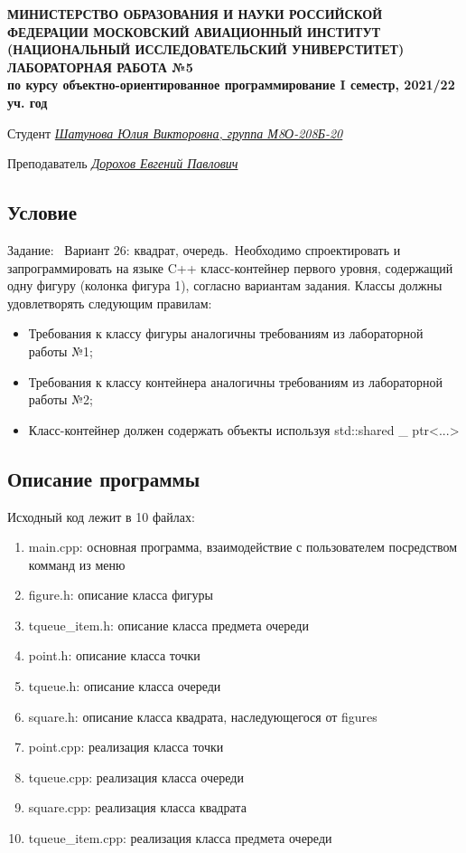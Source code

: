 \documentclass[12pt]{article}
\begin{document}
\begin{titlepage}
\begin{center}
\textbf{МИНИСТЕРСТВО ОБРАЗОВАНИЯ И НАУКИ РОССИЙСКОЙ ФЕДЕРАЦИИ
\medskip
МОСКОВСКИЙ АВИАЦИОННЫЙ ИНСТИТУТ
(НАЦИОНАЛЬНЫЙ ИССЛЕДОВАТЕЛЬСКИЙ УНИВЕРСТИТЕТ)
\vfill\vfill
{\Huge ЛАБОРАТОРНАЯ РАБОТА №5} \\
по курсу объектно-ориентированное программирование
I семестр, 2021/22 уч. год}
\end{center}
\vfill

Студент \uline{\it {Шатунова Юлия Викторовна, группа М8О-208Б-20}\hfill}

Преподаватель \uline{\it {Дорохов Евгений Павлович}\hfill}

\vfill
\end{titlepage}

\subsection*{Условие}

Задание: \
Вариант 26: квадрат, очередь.\
Необходимо спроектировать и запрограммировать на языке C++ класс-контейнер первого
уровня, содержащий одну фигуру (колонка фигура 1), согласно вариантам задания. Классы
должны удовлетворять следующим правилам:
\begin{itemize}
	\item Требования к классу фигуры аналогичны требованиям из лабораторной работы №1;
	\item Требования к классу контейнера аналогичны требованиям из лабораторной работы №2;
	\item Класс-контейнер должен содержать объекты используя std::shared \_ ptr<...>
\end{itemize}


\subsection*{Описание программы}

Исходный код лежит в 10 файлах:
\begin{enumerate}
\item main.cpp: основная программа, взаимодействие с пользователем посредством комманд из меню

\item figure.h:    описание класса фигуры
\item tqueue\_item.h:    описание класса предмета очереди
\item point.h:     описание класса точки
\item tqueue.h:  описание класса очереди
\item square.h: описание класса квадрата, наследующегося от figures
\item point.cpp:     реализация класса точки
\item tqueue.cpp:  реализация класса очереди
\item square.cpp: реализация класса квадрата
\item tqueue\_item.cpp:    реализация класса предмета очереди

\end{enumerate}
\end{document}
